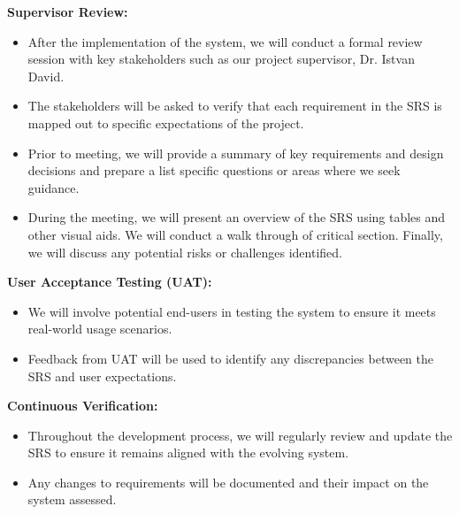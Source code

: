 \documentclass[12pt, titlepage]{article}
\begin{document}
\textbf{Supervisor Review:}
\begin{itemize}
    \item After the implementation of the system, we will conduct a formal review session with key stakeholders such as our project supervisor, Dr. Istvan David.
    \item The stakeholders will be asked to verify that each requirement in the SRS is mapped out to specific expectations of the project. 
    \item Prior to meeting, we will provide a summary of key requirements and design decisions and prepare a list specific questions or areas where we seek guidance.
    \item During the meeting, we will present an overview of the SRS using tables and other visual aids. We will conduct a walk through of critical section. Finally, we will discuss any potential risks or challenges identified.
\end{itemize}

\textbf{User Acceptance Testing (UAT):}
\begin{itemize}
    \item We will involve potential end-users in testing the system to ensure it meets real-world usage scenarios.
    \item Feedback from UAT will be used to identify any discrepancies between the SRS and user expectations.
\end{itemize}

\textbf{Continuous Verification:}
\begin{itemize}
    \item Throughout the development process, we will regularly review and update the SRS to ensure it remains aligned with the evolving system.
    \item Any changes to requirements will be documented and their impact on the system assessed.
\end{itemize}
\end{document}
